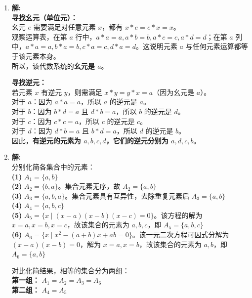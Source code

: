 \begin{enumerate}
	\vspace{1em}
	
	\item \textbf{解:}\\
	\textbf{寻找幺元（单位元）：}\\
	幺元 $e$ 需要满足对任意元素 $x$，都有 $x * e = e * x = x$。\\
	观察运算表，在第 $a$ 行中，$a * a = a, a * b = b, a * c = c, a * d = d$；在第 $a$ 列中，$a * a = a, b * a = b, c * a = c, d * a = d$。这说明元素 $a$ 与任何元素运算都等于该元素本身。\\
	所以，该代数系统的\textbf{幺元是 $a$}。
	
	\textbf{寻找逆元：}\\
	若元素 $x$ 有逆元 $y$，则需满足 $x * y = y * x = a$（因为幺元是 $a$）。\\
	对于 $a$：因为 $a * a = a$，所以 $a$ 的逆元是 $a$。\\
	对于 $b$：因为 $b * d = a$ 且 $d * b = a$，所以 $b$ 的逆元是 $d$。\\
	对于 $c$：因为 $c * c = a$，所以 $c$ 的逆元是 $c$。\\
	对于 $d$：因为 $d * b = a$ 且 $b * d = a$，所以 $d$ 的逆元是 $b$。\\
	因此，\textbf{有逆元的元素为 $a, b, c, d$，它们的逆元分别为 $a, d, c, b$}。
	
	\vspace{1em}
	
	\item \textbf{解:}\\
	分别化简各集合中的元素：\\
	\textbf{(1)} $A_1 = \{a, b\}$\\
	\textbf{(2)} $A_2 = \{b, a\}$。集合元素无序，故 $A_2 = \{a, b\}$\\
	\textbf{(3)} $A_3 = \{a, b, a\}$。集合元素具有互异性，去除重复元素后 $A_3 = \{a, b\}$\\
	\textbf{(4)} $A_4 = \{a, b, c\}$\\
	\textbf{(5)} $A_5 = \{x \mid (x-a)(x-b)(x-c) = 0\}$。该方程的解为 $x=a, x=b, x=c$，故该集合的元素为 $a, b, c$，即 $A_5 = \{a, b, c\}$\\
	\textbf{(6)} $A_6 = \{x \mid x^2-(a+b)x+ab = 0\}$。该一元二次方程可因式分解为 $(x-a)(x-b) = 0$，解为 $x=a, x=b$，故该集合的元素为 $a, b$，即 $A_6 = \{a, b\}$
	
	对比化简结果，相等的集合分为两组：\\
	\textbf{第一组：} $A_1 = A_2 = A_3 = A_6$\\
	\textbf{第二组：} $A_4 = A_5$
	

\end{enumerate}
